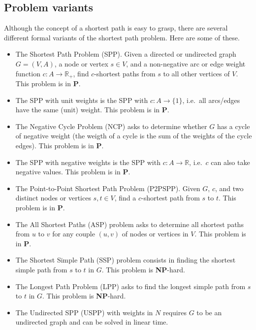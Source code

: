 \documentclass[a4paper]{book}
\theoremstyle{changebreak}                %
\begin{document}
\subsection{Problem variants}
Although the concept of a shortest path is easy to grasp, there are
several different formal variants of the shortest path problem. Here
are some of these.
\begin{itemize}
\item The {\sc Shortest Path Problem} (SPP). Given a directed or
  undirected graph $G=(V,A)$, a node or
  vertex $s\in V$, and a non-negative arc or edge weight
  function $c:A\to\mathbb{R}_+$, find
  $c$-shortest paths from $s$ to all other vertices of $V$. This
  problem is in {\bf P}.
\item The SPP with unit weights is the SPP with
  $c:A\to\{1\}$, i.e.~all arcs/edges have the same (unit) weight. This
  problem is in {\bf P}.
\item The {\sc Negative Cycle Problem} (NCP)
  asks to determine whether $G$ has a cycle of negative weight (the
  weigth of a cycle is the sum of the weights of the cycle edges).
  This problem is in {\bf P}.
\item The SPP with negative weights is the SPP
  with $c:A\to\mathbb{R}$, i.e.~$c$ can also take negative values.
  This problem is in {\bf P}.
\item The {\sc Point-to-Point Shortest Path
  Problem} (P2PSPP). Given $G$, $c$, and
  two distinct nodes or vertices $s,t\in V$, find a $c$-shortest path
  from $s$ to $t$. This problem is in {\bf P}.
\item The {\sc All Shortest Paths} (ASP)
  problem asks to determine all shortest paths from $u$ to $v$ for any
  couple $(u,v)$ of nodes or vertices in $V$. This
  problem is in {\bf P}.
\item The {\sc Shortest Simple Path} (SSP) problem consists in
  finding the shortest simple path from $s$ to $t$
  in $G$. This problem is {\bf NP}-hard.
\item The {\sc Longest Path Problem} (LPP) asks to find the
  longest simple path from $s$
  to $t$ in $G$. This problem is {\bf NP}-hard.
\item The {\sc Undirected SPP} (USPP) with weights in $N$
  requires $G$ to be an undirected graph and
  can be solved in linear time.
\end{itemize}
\end{document}

